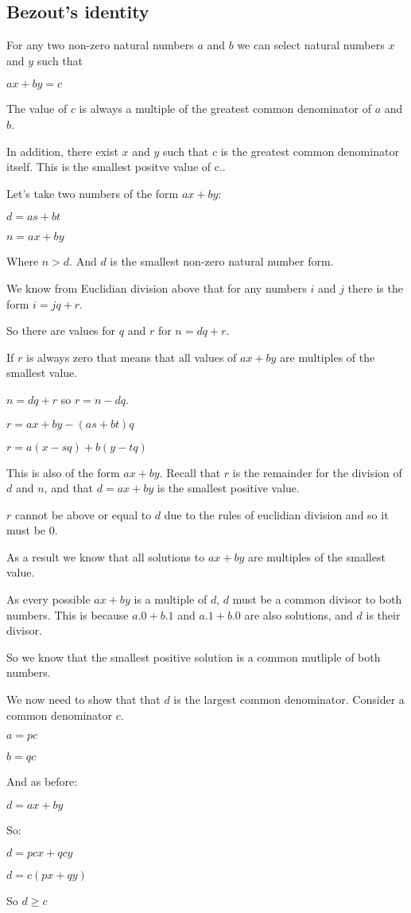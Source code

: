 
\subsection{Bezout's identity}

For any two non-zero natural numbers \(a\) and \(b\) we can select natural numbers \(x\) and \(y\) such that

$ax+by=c$

The value of \(c\) is always a multiple of the greatest common denominator of \(a\) and \(b\).

In addition, there exist \(x\) and \(y\) such that \(c\) is the greatest common denominator itself. This is the smallest positve value of c..


Let's take two numbers of the form \(ax+by\):

$d=as+bt$

$n=ax+by$

Where \(n>d\). And \(d\) is the smallest non-zero natural number form.

We know from Euclidian division above that for any numbers \(i\) and \(j\) there is the form \(i=jq+r\).

So there are values for \(q\) and \(r\) for \(n=dq+r\).

If \(r\) is always zero that means that all values of \(ax+by\) are multiples of the smallest value.

\(n=dq+r\) so \(r=n-dq\).

$r=ax+by-(as+bt)q$

$r=a(x-sq)+b(y-tq)$

This is also of the form \(ax+by\). Recall that \(r\) is the remainder for the division of \(d\) and \(n\), and that \(d=ax+by\) is the smallest positive value.

\(r\) cannot be above or equal to \(d\) due to the rules of euclidian division and so it must be \(0\).

As a result we know that all solutions to \(ax+by\) are multiples of the smallest value.

As every possible \(ax+by\) is a multiple of \(d\), \(d\) must be a common divisor to both numbers. This is because \(a.0+b.1\) and \(a.1+b.0\) are also solutions, and \(d\) is their divisor.

So we know that the smallest positive solution is a common mutliple of both numbers.

We now need to show that that \(d\) is the largest common denominator. Consider a common denominator \(c\).

$a=pc$

$b=qc$

And as before:

$d=ax+by$

So:

$d=pcx+qcy$

$d=c(px+qy)$

So \(d\ge c\)

